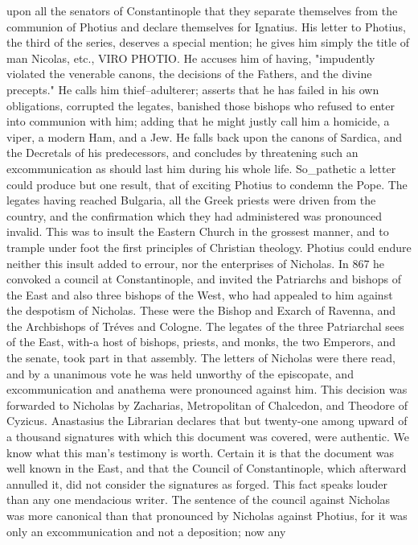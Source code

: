 upon all the senators of Constantinople that they separate themselves from the communion of Photius and declare themselves for Ignatius. His letter to Photius, the third of the series, deserves a special mention; he gives him simply the title of man Nicolas, etc., VIRO PHOTIO. He accuses him of having, "impudently violated the venerable canons, the decisions of the Fathers, and the divine precepts." He calls him thief--adulterer; asserts that he has failed in his own obligations, corrupted the legates, banished those bishops who refused to enter into communion with him; adding that he might justly call him a homicide, a viper, a modern Ham, and a Jew. He falls back upon the canons of Sardica, and the Decretals of his predecessors, and concludes by threatening such an excommunication as should last him during his whole life. So\_pathetic a letter could produce but one result, that of exciting Photius to condemn the Pope. The legates having reached Bulgaria, all the Greek priests were driven from the country, and the confirmation which they had administered was pronounced invalid. This was to insult the Eastern Church in the grossest manner, and to trample under foot the first principles of Christian theology. Photius could endure neither this insult added to errour, nor the enterprises of Nicholas. In 867 he convoked a council at Constantinople, and invited the Patriarchs and bishops of the East and also three bishops of the West, who had appealed to him against the despotism of Nicholas. These were the Bishop and Exarch of Ravenna, and the Archbishops of Tréves and Cologne. The legates of the three Patriarchal sees of the East, with-a host of bishops, priests, and monks, the two Emperors, and the senate, took part in that assembly. The letters of Nicholas were there read, and by a unanimous vote he was held unworthy of the episcopate, and excommunication and anathema were pronounced against him. This decision was forwarded to Nicholas by Zacharias, Metropolitan of Chalcedon, and Theodore of Cyzicus. Anastasius the Librarian declares that but twenty-one among upward of a thousand signatures with which this document was covered, were authentic. We know what this man's testimony is worth. Certain it is that the document was well known in the East, and that the Council of Constantinople, which afterward annulled it, did not consider the signatures as forged. This fact speaks louder than any one mendacious writer. The sentence of the council against Nicholas was more canonical than that pronounced by Nicholas against Photius, for it was only an excommunication and not a deposition; now any

